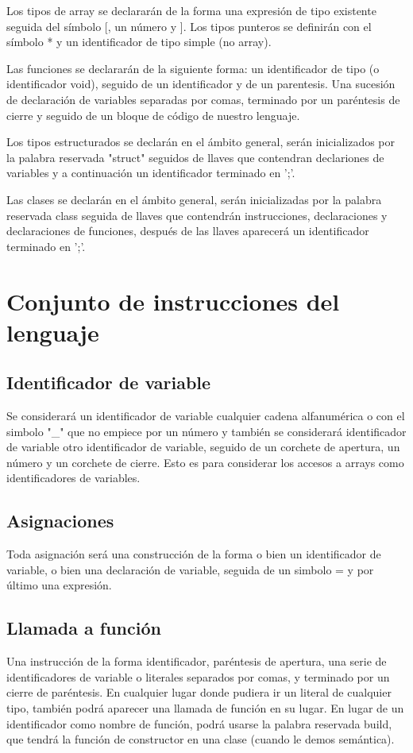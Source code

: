 \documentclass{article}
\begin{document}
\noindent Los tipos de array se declararán de la forma una expresión de tipo existente seguida del símbolo [, un número y ]. Los tipos punteros se definirán con el símbolo * y un identificador de tipo simple (no array).

\noindent Las funciones se declararán de la siguiente forma: un identificador de tipo (o identificador void), seguido de un identificador y de un parentesis. Una sucesión de declaración de variables separadas por comas, terminado por un paréntesis de cierre y seguido de un bloque de código de nuestro lenguaje.

\noindent Los tipos estructurados se declarán en el ámbito general, serán inicializados por la palabra reservada "struct" seguidos de llaves que contendran declariones de variables y a continuación un identificador terminado en ';'.

\noindent Las clases se declarán en el ámbito general, serán inicializadas por la palabra reservada class seguida de llaves que contendrán instrucciones, declaraciones y declaraciones de funciones, después de las llaves aparecerá un identificador terminado en ';'.

\section{Conjunto de instrucciones del lenguaje}

\subsection{Identificador de variable}
Se considerará un identificador de variable cualquier cadena alfanumérica o con el simbolo "\_" que no empiece por un número y también se considerará identificador de variable otro identificador de variable, seguido de un corchete de apertura, un número y un corchete de cierre. Esto es para considerar los accesos a arrays como identificadores de variables.

\subsection{Asignaciones}
Toda asignación será una construcción de la forma o bien un identificador de variable, o bien una declaración de variable, seguida de un simbolo = y por último una expresión.

\subsection{Llamada a función}
Una instrucción de la forma identificador, paréntesis de apertura, una serie de identificadores de variable o literales separados por comas, y terminado por un cierre de paréntesis.
En cualquier lugar donde pudiera ir un literal de cualquier tipo, también podrá aparecer una llamada de función en su lugar. En lugar de un identificador como nombre de función, podrá usarse la palabra reservada build, que tendrá la función de constructor en una clase (cuando le demos semántica).
\end{document}
